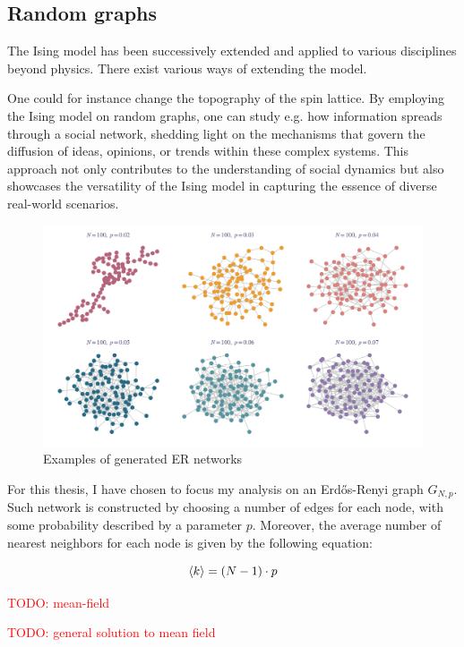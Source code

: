 \documentclass[11pt,a4paper]{article}
\newcommand{\todo}[1]{\textcolor{red}{TODO: #1}}
\begin{document}
\subsection{Random graphs}

The Ising model has been successively extended and applied to various disciplines beyond physics. There exist various ways of extending the model.

One could for instance change the topography of the spin lattice. By employing the Ising model on random graphs, one can study e.g. how information spreads through a social network, shedding light on the mechanisms that govern the diffusion of ideas, opinions, or trends within these complex systems. This approach not only contributes to the understanding of social dynamics but also showcases the versatility of the Ising model in capturing the essence of diverse real-world scenarios.

\begin{figure}[ht!]
    \centering
    \includegraphics[width=\linewidth]{../figures/ER_graph.pdf}
    \caption{Examples of generated ER networks}
\end{figure}


For this thesis, I have chosen to focus my analysis on an Erdős-Renyi graph $G_{N,p}$. Such network is constructed by choosing a number of edges for each node, with some probability described by a parameter $p$. Moreover, the average number of nearest neighbors for each node is given by the following equation:

\begin{equation}
    \braket{k} = (N-1) \cdot p
\end{equation}

\todo{mean-field}

\todo{general solution to mean field}
\end{document}
